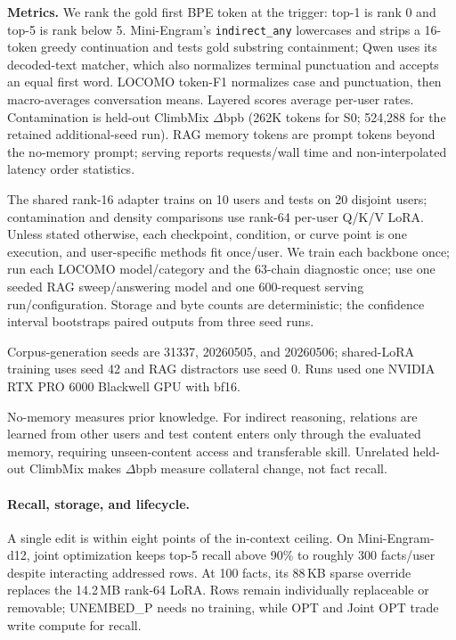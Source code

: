 \documentclass[letterpaper]{article} %
\begin{document}
\textbf{Metrics.} We rank the gold first BPE token at the trigger: top-1 is
rank 0 and top-5 is rank below 5. Mini-Engram's \texttt{indirect\_any}
lowercases and strips a 16-token greedy continuation and tests gold substring
containment; Qwen uses its decoded-text matcher, which also normalizes terminal
punctuation and accepts an equal first word. LOCOMO token-F1 normalizes case
and punctuation, then macro-averages conversation means. Layered scores average
per-user rates. Contamination is held-out ClimbMix $\Delta$bpb (262K tokens
for S0; 524,288 for the retained additional-seed run). RAG memory tokens are
prompt tokens beyond the no-memory prompt; serving reports requests/wall time
and non-interpolated latency order statistics.

The shared rank-16 adapter trains on 10 users and tests on 20 disjoint users;
contamination and density comparisons use rank-64 per-user Q/K/V LoRA. Unless
stated otherwise, each checkpoint, condition, or curve point is one execution,
and user-specific methods fit once/user. We train each backbone once; run each
\mbox{LOCOMO} model/category and the 63-chain diagnostic once; use one seeded
RAG sweep/answering model and one 600-request serving run/configuration.
Storage and byte counts are deterministic; the confidence interval bootstraps
paired outputs from three seed runs.

Corpus-generation seeds are 31337, 20260505, and 20260506; shared-LoRA training
uses seed 42 and RAG distractors use seed 0. Runs used one NVIDIA RTX PRO 6000
Blackwell GPU with bf16.

No-memory measures prior knowledge. For indirect reasoning, relations are
learned from other users and test content enters only through the evaluated
memory, requiring unseen-content access and transferable skill. Unrelated
held-out ClimbMix makes $\Delta$bpb measure collateral change, not fact recall.

\paragraph{Recall, storage, and lifecycle.}
A single edit is within eight points of the in-context ceiling. On
Mini-Engram-d12, joint optimization keeps top-5 recall above 90\% to roughly
300 facts/user despite interacting addressed rows. At 100 facts, its 88\,KB
sparse override replaces the 14.2\,MB rank-64 LoRA. Rows remain individually
replaceable or removable; UNEMBED\_P needs no training, while OPT and Joint OPT
trade write compute for recall.
\end{document}

